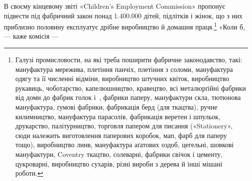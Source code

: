В своєму кінцевому звіті «Children’s Employment Commission» пропонує підвести
під фабричний закон понад \num{1.400.000} дітей, підлітків і жінок, що з них
приблизно половину експлуатує дрібне виробництво
й домашня праця.\footnote{
Галузі промисловости, на які треба поширити фабричне законодавство, такі:
мануфактура мережива, плетіння панчіх, плетіння з соломи, мануфактура одягу
та її численні відміни, виробництво штучних квіток, виробництво рукавиць,
чоботарство, капелюшництво, кравецтво, всі металюрґійні
фабрики від домн до фабрик голок і~, фабрики паперу, мануфактури скла,
тютюнова мануфактура, ґумові фабрики, фабрикація берд (для ткацтва), ручне
килимництво, мануфактура парасолів, фабрикація
веретен і шпульок, друкарство, палітурництво, торговля папером для писання
(«Stationery», сюди належить виготовлення паперових коробок, мап, фарб для
паперу тощо), виробництво линв, мануфактура
аґатових оздоб, цегельні, шовкові мануфактури, Coventry ткацтво, солеварні,
фабрики свічок і цементу, цукроварні, виробництво сухарів, різні вироби з
дерева й інші мішані роботи.
} «Коли б, — каже комісія —
\parbreak{}  %
